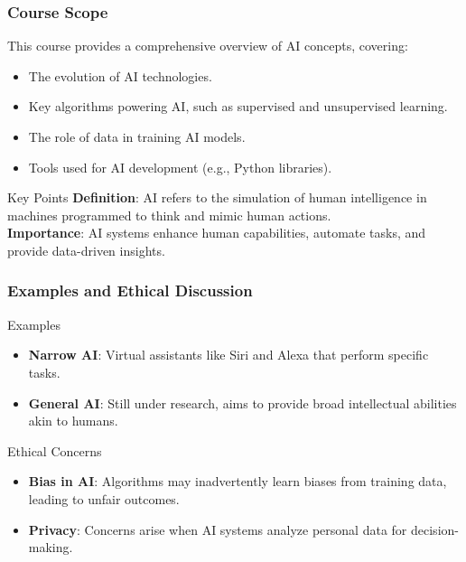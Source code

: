 \documentclass[aspectratio=169]{beamer}
\begin{document}
\begin{frame}[fragile]
    \frametitle{Course Scope}
    This course provides a comprehensive overview of AI concepts, covering:
    \begin{itemize}
        \item The evolution of AI technologies.
        \item Key algorithms powering AI, such as supervised and unsupervised learning.
        \item The role of data in training AI models.
        \item Tools used for AI development (e.g., Python libraries).
    \end{itemize}

    \begin{block}{Key Points}
        \textbf{Definition}: AI refers to the simulation of human intelligence in machines programmed to think and mimic human actions.\\
        \textbf{Importance}: AI systems enhance human capabilities, automate tasks, and provide data-driven insights.
    \end{block}
\end{frame}

\begin{frame}[fragile]
    \frametitle{Examples and Ethical Discussion}
    \begin{block}{Examples}
        \begin{itemize}
            \item \textbf{Narrow AI}: Virtual assistants like Siri and Alexa that perform specific tasks.
            \item \textbf{General AI}: Still under research, aims to provide broad intellectual abilities akin to humans.
        \end{itemize}
    \end{block}
    
    \begin{block}{Ethical Concerns}
        \begin{itemize}
            \item \textbf{Bias in AI}: Algorithms may inadvertently learn biases from training data, leading to unfair outcomes.
            \item \textbf{Privacy}: Concerns arise when AI systems analyze personal data for decision-making.
        \end{itemize}
    \end{block}
\end{frame}
\end{document}
